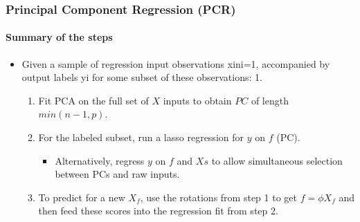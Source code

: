 \documentclass[
  shownotes,
  xcolor={svgnames},
  hyperref={colorlinks,citecolor=DarkBlue,linkcolor=DarkRed,urlcolor=DarkBlue}
  , aspectratio=169]{beamer}
\begin{document}
\begin{frame}[fragile]
\frametitle{ Principal Component Regression (PCR)}
\framesubtitle{Summary of the steps}

\begin{itemize}

\item Given a sample of regression input observations {xi}ni=1, accompanied by output labels yi for some subset of these observations: 1.
\medskip
\begin{enumerate}

  \item Fit PCA on the full set of $X$ inputs to obtain $PC$ of length $min(n-1, p)$. 
  \medskip
  \item For the labeled subset, run a lasso regression for $y$ on $f$ (PC).
  \medskip
    \begin{itemize}
      \item Alternatively, regress $y$ on $f$  and $Xs$ to allow simultaneous selection between PCs and raw inputs. 
      \medskip
    \end{itemize}
  \item To predict for a new $X_{f}$, use the rotations from step 1 to get $f = \phi X_f$ and then feed these scores into the regression fit from step 2. 
  \end{enumerate}

\end{itemize}



\end{frame}
\end{document}

